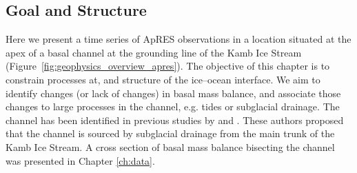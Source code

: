 
\subsection{Goal and Structure}
Here we present a time series of ApRES observations in a location situated at the apex of a basal channel at the grounding line of the Kamb Ice Stream (Figure~\ref{fig:geophysics_overview_apres}).  The objective of this chapter is to constrain processes at, and structure of the ice--ocean interface. We aim to identify changes (or lack of changes) in basal mass balance, and associate those changes to large processes in the channel, e.g. tides or subglacial drainage.
 The channel has been identified in previous studies by \cite{alley2016impacts,kim2016active,goeller2015subglacial} and \cite{horgan2017poststagnation}. These authors proposed that the channel is sourced by subglacial drainage from the main trunk of the Kamb Ice Stream. A cross section of basal mass balance bisecting the channel was presented in Chapter \ref{ch:data}.


